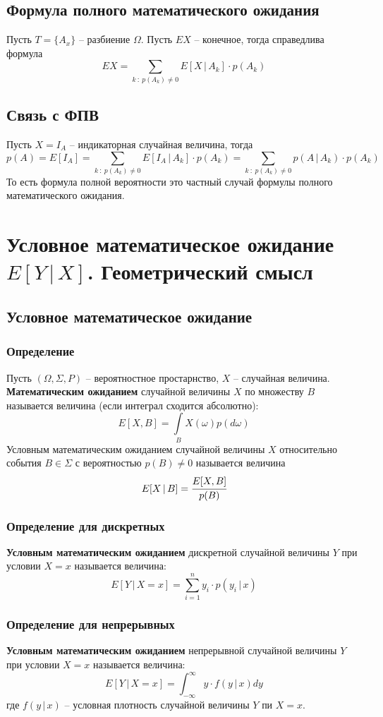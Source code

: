 \documentclass{article}
\begin{document}
\subsection{Формула полного математического ожидания}
Пусть $T=\{A_x\}$ -- разбиение $\Omega$. Пусть $EX$ -- конечное, тогда справедлива формула
$$ EX=\sum_{k\::\:p(A_k)\neq 0} E[X\,|\,A_k]\cdot p(A_k) $$
\subsection{Связь с ФПВ}
Пусть $X=I_A$ -- индикаторная случайная величина, тогда $$p(A)=E[I_A]=\sum_{k\::\:p(A_k)\neq 0} E[I_A\,|\,A_k]\cdot p(A_k)=\sum_{k\::\:p(A_k)\neq 0} p(A\,|\,A_k)\cdot p(A_k)$$ То есть формула полной вероятности это частный случай формулы полного математического ожидания.
\newpage
\section{Условное математическое ожидание $E[Y\,|\,X]$. Геометрический смысл}
\subsection{Условное математическое ожидание}
\subsubsection{Определение}
Пусть $(\Omega,\Sigma,P)$ -- вероятностное простарнство, $X$ -- случайная величина. \textbf{Математическим ожиданием} случайной величины $X$ по множеству $B$ называется величина (если интеграл сходится абсолютно):
$$ E[X,B]=\int\limits_{B}X(\omega)p(d\omega) $$
Условным математическим ожиданием случайной величины $X$ относительно события $B\in\Sigma$ с вероятностью $p(B)\neq 0$ называется величина
$$ E[X\,|\,B]=\cfrac{E[X,B]}{p(B)} $$
\subsubsection{Определение для дискретных}
\textbf{Условным математическим ожиданием} дискретной случайной величины $Y$ при условии $X=x$ называется величина:
$$ E[Y\,|\,X=x]=\sum_{i=1}^n y_i\cdot p(y_i\,|\,x) $$
\subsubsection{Определение для непрерывных}
\textbf{Условным математическим ожиданием} непрерывной случайной величины $Y$ при условии $X=x$ называется величина:
$$ E[Y\,|\,X=x]=\int_{-\infty}^{\infty} y\cdot f(y\,|\,x)dy $$
где $f(y\,|\,x)$ -- условная плотность случайной величины $Y$ пи $X=x$.
\end{document}
